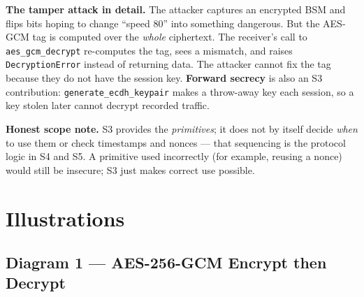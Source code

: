 \documentclass[11pt,a4paper]{report}
\begin{document}
\noindent\textbf{The tamper attack in detail.} The attacker captures an encrypted
BSM and flips bits hoping to change ``speed 80'' into something dangerous. But
the AES-GCM tag is computed over the \emph{whole} ciphertext. The receiver's call
to \texttt{aes\_gcm\_decrypt} re-computes the tag, sees a mismatch, and raises
\texttt{DecryptionError} instead of returning data. The attacker cannot fix the
tag because they do not have the session key. \textbf{Forward secrecy} is also an
S3 contribution: \texttt{generate\_ecdh\_keypair} makes a throw-away key each
session, so a key stolen later cannot decrypt recorded traffic.

\textbf{Honest scope note.} S3 provides the \emph{primitives}; it does not by
itself decide \emph{when} to use them or check timestamps and nonces --- that
sequencing is the protocol logic in S4 and S5. A primitive used incorrectly (for
example, reusing a nonce) would still be insecure; S3 just makes correct use
possible.

\section{Illustrations}

\subsection{Diagram 1 --- AES-256-GCM Encrypt then Decrypt}
\begin{center}
\end{center}
\end{document}
